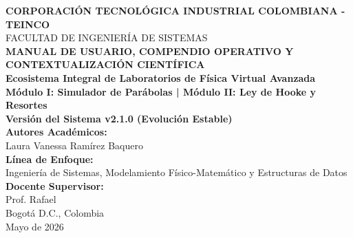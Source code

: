 \documentclass[11pt,a4paper]{article}
\begin{document}
	
	\begin{titlepage}
		\centering
		\vspace*{1cm}
		{\large\bfseries CORPORACIÓN TECNOLÓGICA INDUSTRIAL COLOMBIANA - TEINCO} \\[0.3cm]
		{\large FACULTAD DE INGENIERÍA DE SISTEMAS} \\[2.5cm]
		
		{\color{teincoblue}\Huge\bfseries MANUAL DE USUARIO, COMPENDIO OPERATIVO Y CONTEXTUALIZACIÓN CIENTÍFICA} \\[0.8cm]
		{\color{accentblue}\Large\bfseries Ecosistema Integral de Laboratorios de Física Virtual Avanzada} \\[0.5cm]
		{\large\bfseries Módulo I: Simulador de Parábolas | Módulo II: Ley de Hooke y Resortes} \\[1cm]
		{\normalsize\bfseries Versión del Sistema v2.1.0 (Evolución Estable)} \\[2.5cm]
		
		\textbf{Autores Académicos:} \\
		Laura Vanessa Ramírez Baquero \\
		
		
		\textbf{Línea de Enfoque:} \\
		Ingeniería de Sistemas, Modelamiento Físico-Matemático y Estructuras de Datos \\[1.5cm]
		
		\textbf{Docente Supervisor:} \\
		Prof. Rafael \\[2cm]
		
		\vfill
		{\large Bogotá D.C., Colombia \\ Mayo de 2026}
	\end{titlepage}
	
	\tableofcontents
	
	\newpage 
	
\end{document}
